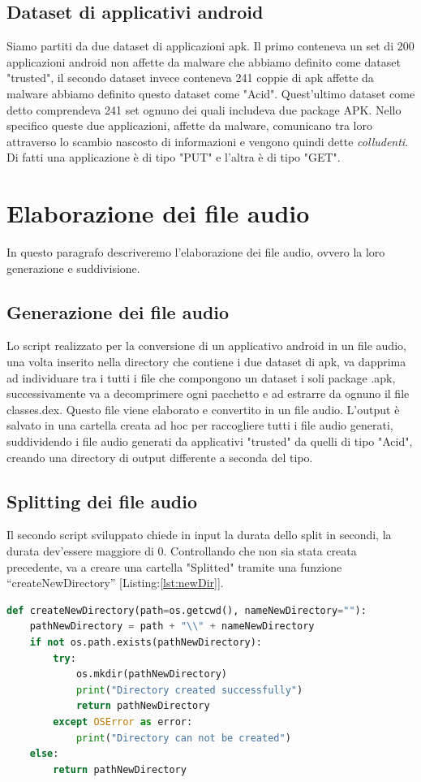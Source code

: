 \subsection{Dataset di applicativi android}
Siamo partiti da due dataset di applicazioni apk. Il primo conteneva un set di 200 applicazioni android non affette da malware che abbiamo definito come dataset "trusted", il secondo dataset invece conteneva 241 coppie di apk affette da malware abbiamo definito questo dataset come "Acid". Quest'ultimo dataset come detto comprendeva 241 set ognuno dei quali includeva due package APK. Nello specifico queste due applicazioni, affette da malware, comunicano tra loro attraverso lo scambio nascosto di informazioni e vengono quindi dette \textit{colludenti}. Di fatti una applicazione è di tipo "PUT" e l'altra è di tipo "GET". 

\section{Elaborazione dei file audio}
In questo paragrafo descriveremo l'elaborazione dei file audio, ovvero la loro generazione e suddivisione.

\subsection{Generazione dei file audio}
\label{par:gen}
Lo script realizzato per la conversione di un applicativo android in un file audio, una volta inserito nella directory che contiene i due dataset di apk, va dapprima ad individuare tra i tutti i file che compongono un dataset i soli package .apk, successivamente va a decomprimere ogni pacchetto e ad estrarre da ognuno il file classes.dex. Questo file viene elaborato e  convertito in un file audio. L'output è salvato in una cartella creata ad hoc per raccogliere tutti i file audio generati,  suddividendo i file audio generati da applicativi "trusted" da quelli di tipo "Acid", creando una directory di output differente a seconda del tipo. 

\subsection{Splitting dei file audio}
Il secondo script sviluppato chiede in input la durata dello split in secondi, la durata dev’essere maggiore di 0.
Controllando che non sia stata creata precedente, va a creare una cartella "Splitted" tramite una funzione “createNewDirectory” [Listing:\ref{lst:newDir}].
\begin{lstlisting}[language=Python, caption=Create new directory function, label = lst:newDir]
def createNewDirectory(path=os.getcwd(), nameNewDirectory=""):
    pathNewDirectory = path + "\\" + nameNewDirectory
    if not os.path.exists(pathNewDirectory):
        try:
            os.mkdir(pathNewDirectory)
            print("Directory created successfully")
            return pathNewDirectory
        except OSError as error:
            print("Directory can not be created")
    else:
        return pathNewDirectory
\end{lstlisting}


